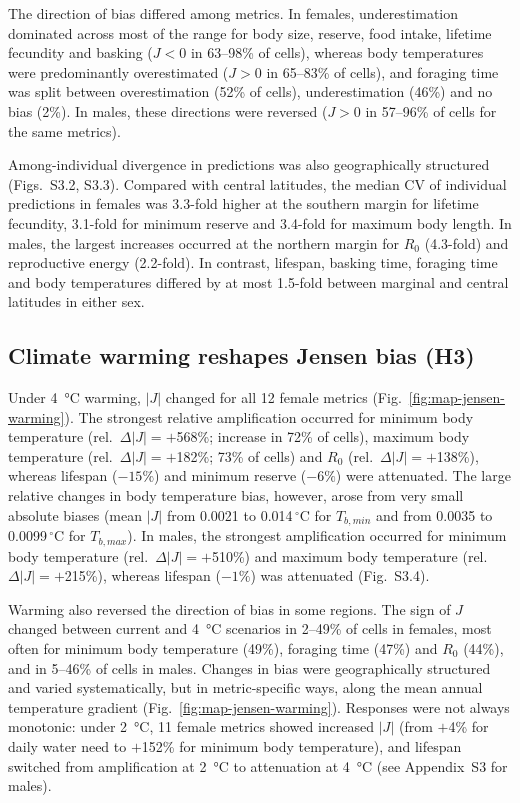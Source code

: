 \documentclass[12pt]{article}
\begin{document}
The direction of bias differed among metrics. In females, underestimation dominated across most of the range for body size, reserve, food intake, lifetime fecundity and basking ($J<0$ in 63--98\% of cells), whereas body temperatures were predominantly overestimated ($J>0$ in 65--83\% of cells), and foraging time was split between overestimation (52\% of cells), underestimation (46\%) and no bias (2\%). In males, these directions were reversed ($J>0$ in 57--96\% of cells for the same metrics).

Among-individual divergence in predictions was also geographically structured (Figs.~S3.2, S3.3). Compared with central latitudes, the median CV of individual predictions in females was 3.3-fold higher at the southern margin for lifetime fecundity, 3.1-fold for minimum reserve and 3.4-fold for maximum body length. In males, the largest increases occurred at the northern margin for $R_0$ (4.3-fold) and reproductive energy (2.2-fold). In contrast, lifespan, basking time, foraging time and body temperatures differed by at most 1.5-fold between marginal and central latitudes in either sex.

\subsection{Climate warming reshapes Jensen bias (H3)}

Under \qty{+4}{\celsius} warming, $|J|$ changed for all 12 female metrics (Fig.~\ref{fig:map-jensen-warming}). The strongest relative amplification occurred for minimum body temperature (rel.\ $\Delta|J| = +$568\%; increase in 72\% of cells), maximum body temperature (rel.\ $\Delta|J| = +$182\%; 73\% of cells) and $R_0$ (rel.\ $\Delta|J| = +$138\%), whereas lifespan ($-15\%$) and minimum reserve ($-6\%$) were attenuated. The large relative changes in body temperature bias, however, arose from very small absolute biases (mean $|J|$ from 0.0021 to 0.014\,${}^{\circ}$C for $T_{b,min}$ and from 0.0035 to 0.0099\,${}^{\circ}$C for $T_{b,max}$). In males, the strongest amplification occurred for minimum body temperature (rel.\ $\Delta|J| = +$510\%) and maximum body temperature (rel.\ $\Delta|J| = +$215\%), whereas lifespan ($-1\%$) was attenuated (Fig.~S3.4).

Warming also reversed the direction of bias in some regions. The sign of $J$ changed between current and \qty{+4}{\celsius} scenarios in 2--49\% of cells in females, most often for minimum body temperature (49\%), foraging time (47\%) and $R_0$ (44\%), and in 5--46\% of cells in males. Changes in bias were geographically structured and varied systematically, but in metric-specific ways, along the mean annual temperature gradient (Fig.~\ref{fig:map-jensen-warming}). Responses were not always monotonic: under \qty{+2}{\celsius}, 11 female metrics showed increased $|J|$ (from $+$4\% for daily water need to $+$152\% for minimum body temperature), and lifespan switched from amplification at \qty{+2}{\celsius} to attenuation at \qty{+4}{\celsius} (see Appendix~S3 for males).
\end{document}
